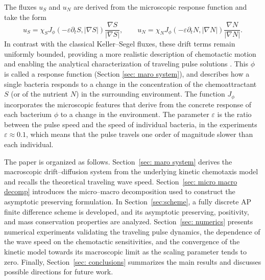 \documentclass[11pt,twoside]{article}
\numberwithin{equation}{section}
\theoremstyle{plain}
\theoremstyle{nonumberplain}
\begin{document}
The fluxes $u_S$ and $u_N$ are derived from the microscopic response function and take
the form \cite{saragosti2010mathematical}
\begin{equation}
\label{eq:flux_intro}
u_S
=
\chi_S J_\phi(-\varepsilon \partial_t S, |\nabla S|)
\frac{\nabla S}{|\nabla S|},
\qquad
u_N
=
\chi_N J_\phi(-\varepsilon \partial_t N, |\nabla N|)
\frac{\nabla N}{|\nabla N|}.
\end{equation}
In contrast with the classical Keller--Segel fluxes, these drift terms remain uniformly
bounded, providing a more realistic description of chemotactic motion and enabling the
analytical characterization of traveling pulse solutions \cite{calvez2019chemotactic}.
 This $\phi$ is called a response function (Section \ref{sec: maro system}), and describes how a single bacteria responds to a change in the concentration of the chemoattractant $S$ (or of the nutrient $N$) in the surrounding environment. The function $J_\phi$ incorporates the microscopic features that derive from the concrete response of each bacterium $\phi$ to a change in the environment. The parameter $\varepsilon$ is the ratio between the pulse speed and the speed of
individual bacteria, in the experiments  $\varepsilon \approx 0.1$, which means that the pulse travels one order of magnitude slower than each individual.










The paper is organized as follows. Section~\ref{sec: maro system} derives the macroscopic drift–diffusion system from the underlying kinetic chemotaxis model and recalls the theoretical traveling wave speed. Section~\ref{sec: micro macro decomp} introduces the micro–macro decomposition used to construct the asymptotic preserving formulation. In Section~\ref{sec:scheme}, a fully discrete AP finite difference scheme is developed, and its asymptotic preserving, positivity, and mass conservation properties are analyzed. Section~\ref{sec: numerics} presents numerical experiments validating the traveling pulse dynamics, the dependence of the wave speed on the chemotactic sensitivities, and the convergence of the kinetic model towards its macroscopic limit as the scaling parameter tends to zero. Finally, Section~\ref{sec: conclusions} summarizes the main results and discusses possible directions for future work.
\end{document}
